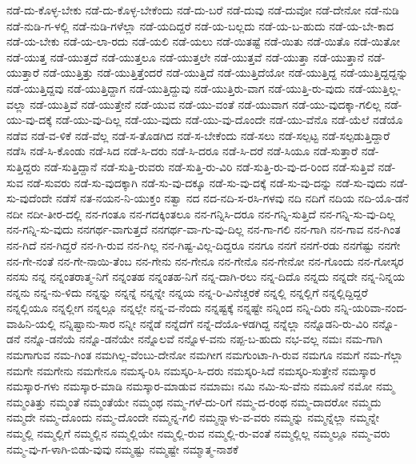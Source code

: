 ನಡೆ-ದು-ಕೊಳ್ಳ-ಬೇಕು
ನಡೆ-ದು-ಕೊಳ್ಳ-ಬೇಕೆಂದು
ನಡೆ-ದು-ಬರೆ
ನಡೆ-ದುವು
ನಡೆ-ದುವೋ
ನಡೆ-ದೇನೋ
ನಡೆ-ನುಡಿ
ನಡೆ-ನುಡಿ-ಗ-ಳಲ್ಲಿ
ನಡೆ-ನುಡಿ-ಗಳೆಲ್ಲಾ
ನಡೆ-ಯದಿದ್ದರೆ
ನಡೆ-ಯ-ಬಲ್ಲದು
ನಡೆ-ಯ-ಬ-ಹುದು
ನಡೆ-ಯ-ಬೇ-ಕಾದ
ನಡೆ-ಯ-ಬೇಕು
ನಡೆ-ಯ-ಲಾ-ರದು
ನಡೆ-ಯಲಿ
ನಡೆ-ಯಲು
ನಡೆ-ಯಿತಷ್ಟೆ
ನಡೆ-ಯಿತು
ನಡೆ-ಯಿತೊ
ನಡೆ-ಯಿತೋ
ನಡೆ-ಯುತ್ತ
ನಡೆ-ಯುತ್ತದೆ
ನಡೆ-ಯುತ್ತಲೂ
ನಡೆ-ಯುತ್ತಲೇ
ನಡೆ-ಯುತ್ತವೆ
ನಡೆ-ಯುತ್ತಾ
ನಡೆ-ಯುತ್ತಾನೆ
ನಡೆ-ಯುತ್ತಾರೆ
ನಡೆ-ಯುತ್ತಿತ್ತು
ನಡೆ-ಯುತ್ತಿತ್ತೆಂದರೆ
ನಡೆ-ಯುತ್ತಿದೆ
ನಡೆ-ಯುತ್ತಿದೆಯೋ
ನಡೆ-ಯುತ್ತಿದ್ದ
ನಡೆ-ಯುತ್ತಿದ್ದದ್ದನ್ನು
ನಡೆ-ಯುತ್ತಿದ್ದವು
ನಡೆ-ಯುತ್ತಿದ್ದಾಗ
ನಡೆ-ಯುತ್ತಿದ್ದುವು
ನಡೆ-ಯುತ್ತಿರು-ವಾಗ
ನಡೆ-ಯುತ್ತಿ-ರು-ವುದು
ನಡೆ-ಯುತ್ತಿಲ್ಲ-ವಲ್ಲಾ
ನಡೆ-ಯುತ್ತಿವೆ
ನಡೆ-ಯುತ್ತೇನೆ
ನಡೆ-ಯುವ
ನಡೆ-ಯು-ವಂತೆ
ನಡೆ-ಯುವಾಗ
ನಡೆ-ಯು-ವುದಕ್ಕಾ-ಗಲಿಲ್ಲ
ನಡೆ-ಯು-ವು-ದಕ್ಕೆ
ನಡೆ-ಯು-ವು-ದಿಲ್ಲ
ನಡೆ-ಯು-ವುದು
ನಡೆ-ಯು-ವು-ದೊಂದೇ
ನಡೆ-ಯು-ವೆನೊ
ನಡೆ-ಯೆಲೆ
ನಡೆಯೊ
ನಡೆವ
ನಡೆ-ವ-ಳಿಕೆ
ನಡೆ-ವೆಲ್ಲ
ನಡೆ-ಸ-ತೊಡಗಿದ
ನಡೆ-ಸ-ಬೇಕೆಂದು
ನಡೆ-ಸಲು
ನಡೆ-ಸಲ್ಪಟ್ಟ
ನಡೆ-ಸಲ್ಪಡುತ್ತಿದ್ದಾರೆ
ನಡೆಸಿ
ನಡೆ-ಸಿ-ಕೊಂಡು
ನಡೆ-ಸಿದ
ನಡೆ-ಸಿ-ದರು
ನಡೆ-ಸಿ-ದರೂ
ನಡೆ-ಸಿ-ದರೆ
ನಡೆ-ಸಿಯೂ
ನಡೆ-ಸುತ್ತಾರೆ
ನಡೆ-ಸುತ್ತಿದ್ದರು
ನಡೆ-ಸುತ್ತಿದ್ದಾನೆ
ನಡೆ-ಸುತ್ತಿ-ರುವರು
ನಡೆ-ಸುತ್ತಿ-ರು-ವಿರಿ
ನಡೆ-ಸುತ್ತಿ-ರು-ವು-ದ-ರಿಂದ
ನಡೆ-ಸುತ್ತಿವೆ
ನಡೆ-ಸುವ
ನಡೆ-ಸುವರು
ನಡೆ-ಸು-ವುದಕ್ಕಾಗಿ
ನಡೆ-ಸು-ವು-ದಕ್ಕೂ
ನಡೆ-ಸು-ವು-ದಕ್ಕೆ
ನಡೆ-ಸು-ವು-ದನ್ನು
ನಡೆ-ಸು-ವುದು
ನಡೆ-ಸು-ವುದೆಂದೇ
ನಡೆಸೆ
ನತ-ನಯನ-ನಿ-ಯುಕ್ತಂ
ನತ್ವಾ
ನದ
ನದ-ನದಿ-ಸ-ರಸಿ-ಗಳವು
ನದಿ
ನದಿಗೆ
ನದಿಯ
ನದಿ-ಯೊ-ಡನೆ
ನದೀ
ನದೀ-ತೀರ-ದಲ್ಲಿ
ನನ-ಗಂತೂ
ನನ-ಗದಕ್ಕಿಂತಲೂ
ನನ-ಗನ್ನಿಸಿ-ದರೂ
ನನ-ಗನ್ನಿ-ಸುತ್ತಿದೆ
ನನ-ಗನ್ನಿ-ಸು-ವು-ದಿಲ್ಲ
ನನ-ಗನ್ನಿ-ಸು-ವುದು
ನನಗರ್ಥ-ವಾಗುತ್ತದೆ
ನನಗರ್ಥ-ವಾ-ಗು-ವು-ದಿಲ್ಲ
ನನ-ಗಾ-ಗಲಿ
ನನ-ಗಾಗಿ
ನನ-ಗಾವ
ನನ-ಗಿಂತ
ನನ-ಗಿದೆ
ನನ-ಗಿದ್ದರೆ
ನನ-ಗಿ-ರುವ
ನನ-ಗಿಲ್ಲ
ನನ-ಗಿಷ್ಟ-ವಿಲ್ಲ-ದಿದ್ದರೂ
ನನಗೂ
ನನಗೆ
ನನಗೆ-ರಡು
ನನಗೆಷ್ಟು
ನನಗೇ
ನನ-ಗೇ-ನಂತೆ
ನನ-ಗೇ-ನಾಯಿ-ತೆಂಬ
ನನ-ಗೇನು
ನನ-ಗೇನೂ
ನನ-ಗೇನೊ
ನನ-ಗೇನೋ
ನನ-ಗೊಂದು
ನನ-ಗೋಸ್ಕರ
ನನಸು
ನನ್ನ
ನನ್ನಂತರಾತ್ಮ-ನಿಗೆ
ನನ್ನಂತಹ
ನನ್ನಂತಹ-ನಿಗೆ
ನನ್ನ-ದಾಗಿ-ರಲು
ನನ್ನ-ದಿದೊ
ನನ್ನದು
ನನ್ನದೇ
ನನ್ನ-ನಿನ್ನಯ
ನನ್ನನು
ನನ್ನ-ನು-ಳಿದು
ನನ್ನನ್ನು
ನನ್ನನ್ನೆ
ನನ್ನನ್ನೇ
ನನ್ನಯ
ನನ್ನ-ರಿ-ವಿನೆಚ್ಚರಕೆ
ನನ್ನಲ್ಲಿ
ನನ್ನಲ್ಲಿಗೆ
ನನ್ನಲ್ಲಿದ್ದಿದ್ದರೆ
ನನ್ನಲ್ಲಿಯೂ
ನನ್ನಲ್ಲೀಗ
ನನ್ನಲ್ಲೂ
ನನ್ನಲ್ಲೇ
ನನ್ನ-ವ-ನೆಂದು
ನನ್ನಷ್ಟಕ್ಕೆ
ನನ್ನಷ್ಟೇ
ನನ್ನಿಂದ
ನನ್ನಿ-ದಿರು
ನನ್ನಿ-ಯರಿವಾ-ನಂದ-ವಾಹಿನಿ-ಯಲ್ಲಿ
ನನ್ನಿಷ್ಟಾನು-ಸಾರ
ನನ್ನೀ
ನನ್ನೆಡೆ
ನನ್ನೆದೆಗೆ
ನನ್ನೆ-ದೆಯೊ-ಳಡಗಿದ್ದ
ನನ್ನೆಲ್ಲಾ
ನನ್ನೊಡನಿ-ರು-ವಿರಿ
ನನ್ನೊ-ಡನೆ
ನನ್ನೊ-ಡನೆಯೆ
ನನ್ನೊ-ಡನೆಯೇ
ನನ್ನೊಲವೆ
ನನ್ನೊಳ-ವನು
ನಪ್ಪ-ಬ-ಹುದು
ನಭ-ವಲ್ಲ
ನಮಃ
ನಮ-ಗಾಗಿ
ನಮಗಾಗುವ
ನಮ-ಗಿಂತ
ನಮಗಿಲ್ಲ-ವೆಂಬು-ದೇನೋ
ನಮಗೀಗ
ನಮಗುಂಟಾ-ಗಿ-ರುವ
ನಮಗೂ
ನಮಗೆ
ನಮ-ಗೆಲ್ಲಾ
ನಮಗೇ
ನಮಗೇನು
ನಮಗೇನೂ
ನಮಸ್ಕ-ರಿಸಿ
ನಮಸ್ಕರಿ-ಸಿ-ದರು
ನಮಸ್ಕರಿ-ಸಿದೆ
ನಮಸ್ಕರಿ-ಸುತ್ತೇನೆ
ನಮಸ್ಕಾರ
ನಮಸ್ಕಾರ-ಗಳು
ನಮಸ್ಕಾರ-ಮಾಡಿ
ನಮಸ್ಕಾರ-ಮಾಡುವ
ನಮಾಮಃ
ನಮಿ
ನಮಿ-ಸು-ವೆನು
ನಮೂನೆ
ನಮೋ
ನಮ್ಮ
ನಮ್ಮಂತಿತ್ತು
ನಮ್ಮಂತೆ
ನಮ್ಮಂತೆಯೇ
ನಮ್ಮಂಥ
ನಮ್ಮ-ಗಳೆ-ದು-ರಿಗೆ
ನಮ್ಮ-ದ-ರಂಥ
ನಮ್ಮ-ದಾದರೋ
ನಮ್ಮದು
ನಮ್ಮದೇ
ನಮ್ಮ-ದೊಂದು
ನಮ್ಮ-ದೊಂದೇ
ನಮ್ಮನ್ನ-ಗಲಿ
ನಮ್ಮನ್ನಾಳು-ವ-ವರು
ನಮ್ಮನ್ನು
ನಮ್ಮನ್ನೆಲ್ಲಾ
ನಮ್ಮನ್ನೇ
ನಮ್ಮಲ್ಲಿ
ನಮ್ಮಲ್ಲಿಗೆ
ನಮ್ಮಲ್ಲಿನ
ನಮ್ಮಲ್ಲಿಯೇ
ನಮ್ಮಲ್ಲಿ-ರುವ
ನಮ್ಮಲ್ಲಿ-ರು-ವಂತೆ
ನಮ್ಮಲ್ಲಿಲ್ಲ
ನಮ್ಮಲ್ಲೂ
ನಮ್ಮ-ವರು
ನಮ್ಮ-ವು-ಗ-ಳಾಗಿ-ಬಿಡು-ವುವು
ನಮ್ಮಷ್ಟು
ನಮ್ಮಷ್ಟೇ
ನಮ್ಮಾತ್ಮ-ನಾಶಕೆ

